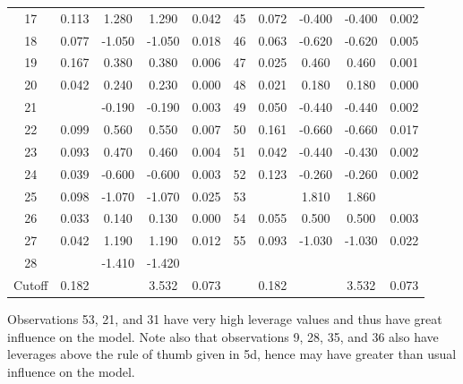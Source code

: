 \documentclass{homework}
\begin{document}
\begin{longproblem}
\begin{center}
\begin{tabular}{c c c c c | c c c c c}
  17 &  0.113 &  1.280 &  1.290 &  0.042 &                 45  &  0.072 &  -0.400 &  -0.400 &  0.002 \\
  18 &  0.077 &  -1.050 &  -1.050 &  0.018 &               46  &  0.063 &  -0.620 &  -0.620 &  0.005 \\
  19 &  0.167 &  0.380 &  0.380 &  0.006 &                 47  &  0.025 &  0.460 &  0.460 &  0.001 \\
  20 &  0.042 &  0.240 &  0.230 &  0.000 &                 48  &  0.021 &  0.180 &  0.180 &  0.000 \\
  21 &  \a{0.314} &  -0.190 &  -0.190 &  0.003 &           49  &  0.050 &  -0.440 &  -0.440 &  0.002 \\
  22 &  0.099 &  0.560 &  0.550 &  0.007 &                 50  &  0.161 &  -0.660 &  -0.660 &  0.017 \\
  23 &  0.093 &  0.470 &  0.460 &  0.004 &                 51  &  0.042 &  -0.440 &  -0.430 &  0.002 \\
  24 &  0.039 &  -0.600 &  -0.600 &  0.003 &               52  &  0.123 &  -0.260 &  -0.260 &  0.002 \\
  25 &  0.098 &  -1.070 &  -1.070 &  0.025 &               53  &  \a{0.460} &  1.810 &  1.860 &  \a{0.558} \\
  26 &  0.033 &  0.140 &  0.130 &  0.000 &                 54  &  0.055 &  0.500 &  0.500 &  0.003 \\
  27 &  0.042 &  1.190 &  1.190 &  0.012 &                 55  &  0.093 &  -1.030 &  -1.030 &  0.022 \\
  28 &  \a{0.185} &  -1.410 &  -1.420 &  \a{0.090} & & & & & \\
\hline
Cutoff & 0.182 &  &  3.532 & 0.073 & & 0.182 &  &  3.532 & 0.073 \\

 \end{tabular} 
\end{center}


  Observations 53, 21, and 31 have very high leverage values and thus have great influence on the model.  Note also that observations 9, 28, 35, and 36 also have leverages above the rule of thumb given in 5d, hence may have greater than usual influence on the model. 



\end{longproblem}
\end{document}
